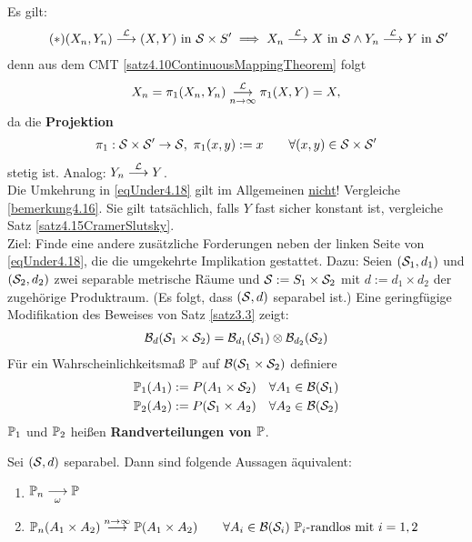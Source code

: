 Es gilt:
\begin{align}\label{eqUnder4.18}\tag{$\ast$}
	(X_n,Y_n)\stackrel{\L}{\longrightarrow}(X,Y)\text { in }\S\times S'
	\implies X_n\stackrel{\L}{\longrightarrow} X\text{ in }\S\wedge
	Y_n\stackrel{\L}{\longrightarrow} Y\text{ in }\S'
\end{align}
denn aus dem CMT \ref{satz4.10ContinuousMappingTheorem} folgt
\begin{align*}
	X_n=\pi_1(X_n,Y_n)\stackrelnew{n\to\infty}{\L}{\longrightarrow}\pi_1(X,Y)=X,
\end{align*}
da die \textbf{Projektion}
\begin{align*}
	\pi_1:\S\times\S'\to\S,~\pi_1(x,y):=x\qquad\forall (x,y)\in\S\times\S'
\end{align*}
stetig ist. Analog: $Y_n\stackrel{\L}{\longrightarrow} Y$.\\
Die Umkehrung in \eqref{eqUnder4.18} gilt im Allgemeinen \underline{nicht}! 
Vergleiche \ref{bemerkung4.16}. 
Sie gilt tatsächlich, falls $Y$ fast sicher konstant ist, vergleiche Satz \ref{satz4.15CramerSlutsky}.\\
Ziel: Finde eine andere zusätzliche Forderungen neben der linken Seite von \eqref{eqUnder4.18}, die die umgekehrte Implikation gestattet. 
Dazu:\nl
Seien $(\S_1,d_1)$ und $(\S_2,d_2)$ zwei separable metrische Räume und $\S:=S_1\times\S_2$ mit $d:=d_1\times d_2$ der zugehörige Produktraum. 
(Es folgt, dass $(\S,d)$ separabel ist.) 
Eine geringfügige Modifikation des Beweises von Satz \ref{satz3.3} zeigt:
\begin{align*}
	\B_d(\S_1\times\S_2)=\B_{d_1}(\S_1)\otimes\B_{d_2}(\S_2)
\end{align*}
Für ein Wahrscheinlichkeitsmaß $\P$ auf $\B(\S_1\times\S_2)$ definiere 
\begin{align*}
	\P_1(A_1)&:=P(A_1\times\S_2) &\forall A_1\in\B(\S_1)\\
	\P_2(A_2)&:=P(\S_1\times A_2) &\forall A_2\in\B(\S_2)
\end{align*}
$\P_1$ und $\P_2$ heißen \textbf{Randverteilungen von $\P$}.

\begin{theorem}\label{theorem4.19}
	Sei $(\S,d)$ separabel. 
	Dann sind folgende Aussagen äquivalent:
	\begin{enumerate}[label=(\arabic*)]
		\item $\begin{aligned}
			\P_n\stackrelnew{\omega}{}{\longrightarrow} \P 
		\end{aligned}$
		\item $\begin{aligned}
			\P_n(A_1\times A_2)\stackrel{n\to\infty}{\longrightarrow} \P(A_1\times A_2)\qquad\forall A_i\in\B(\S_i)~\P_i\text{-randlos mit } i=1,2
		\end{aligned}$
	\end{enumerate}
\end{theorem}

